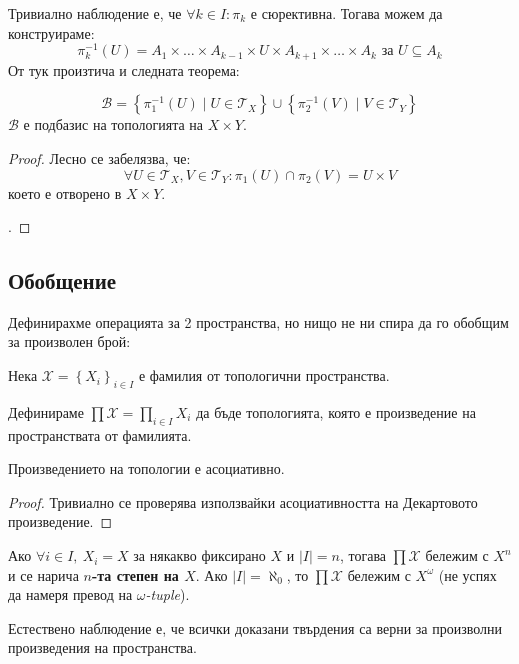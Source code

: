 Тривиално наблюдение е, че $\forall k \in I: \pi_k$ е сюрективна. Тогава можем да конструираме:
\begin{equation*}
    \pi_k^{-1}(U) = A_1 \times \dots \times A_{k-1} \times U \times A_{k+1} \times \dots \times A_k \text{ за } U \subseteq A_k
\end{equation*}
От тук произтича и следната теорема:
\begin{theorem}
    \begin{equation*}
        \mathcal B = \left\{ \pi_1^{-1}(U) \mid U \in \mathcal T_X \right\} \cup \left\{ \pi_2^{-1}(V) \mid V \in \mathcal T_Y \right\}
    \end{equation*}
    $\mathcal B$ е подбазис на топологията на $X \times Y$.
\end{theorem}
\begin{proof}
    Лесно се забелязва, че:
    \begin{equation*}
        \forall U \in \mathcal T_X, V\in \mathcal T_Y : \pi_1(U) \cap \pi_2(V) = U \times V
    \end{equation*}
    което е отворено в $X \times Y$.
    
    \cite[p.~88]{munkrestopology}.
\end{proof}

\subsection{Обобщение}
Дефинирахме операцията за 2 пространства, но нищо не ни спира да го обобщим за произволен брой:
\begin{definition}
    Нека $\mathcal X = \left\{X_i\right\}_{i \in I}$ е фамилия от топологични пространства.

    Дефинираме $\prod \mathcal X = \prod\limits_{i \in I}X_i$ да бъде топологията, която е произведение на пространствата от фамилията.
\end{definition}
\begin{proposition}
    Произведението на топологии е асоциативно.
\end{proposition}
\begin{proof}
    Тривиално се проверява използвайки асоциативността на Декартовото произведение.
\end{proof}
\begin{notation}
    Ако $\forall i \in I,\ X_i = X$ за някакво фиксирано $X$ и $|I| = n$, тогава $\prod \mathcal X $ бележим с $X^n$ и се нарича \textbf{$n$-та степен на $X$}. Ако $|I| = \aleph_0$, то $\prod \mathcal X $ бележим с $X^\omega$ (не успях да намеря превод на \emph{$\omega$-tuple}).
\end{notation}
Естествено наблюдение е, че всички доказани твърдения са верни за произволни произведения на пространства.

